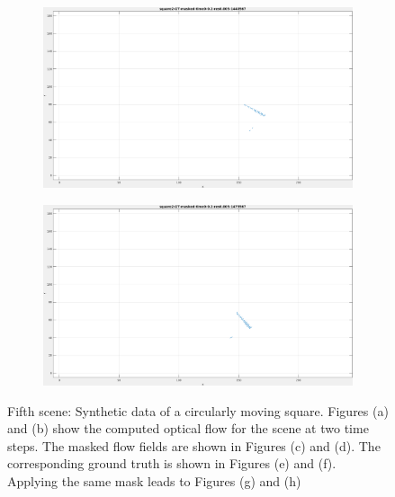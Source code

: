 \begin{appendix}
\begin{figure}[tb]
\begin{subfigure}{.45\textwidth}
  \caption{}
\end{subfigure}
\begin{subfigure}{.45\textwidth}
  \centering
  \includegraphics[height=.6\linewidth]{figs/square2/square2-GT-masked-1.png}
  \caption{}
\end{subfigure}
\begin{subfigure}{.45\textwidth}
  \centering
  \includegraphics[height=.6\linewidth]{figs/square2/square2-GT-masked-2.png}
  \caption{}
\end{subfigure}
\caption[Fifth scene: Synthetic data of a circularly moving square.]{Fifth scene: Synthetic data of a circularly moving square.
Figures (a) and (b) show the computed optical flow for the scene at two time steps. The masked flow fields are shown in Figures (c) and (d).
The corresponding ground truth is shown in Figures (e) and (f). Applying the same mask leads to Figures (g) and (h)}
\label{fig:app_square2-snapshots}
\end{figure} 
	 

\end{appendix}
